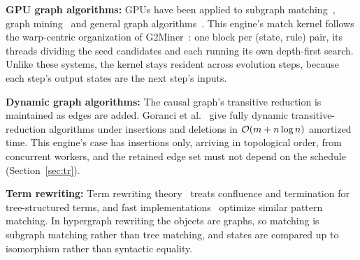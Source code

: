 \textbf{GPU graph algorithms:} GPUs have been applied to subgraph matching~\cite{tran2015fast}, graph mining~\cite{chen2021pangolin} and general graph algorithms~\cite{wang2016gunrock}. This engine's match kernel follows the warp-centric organization of G2Miner~\cite{chen2022g2miner}: one block per (state, rule) pair, its threads dividing the seed candidates and each running its own depth-first search. Unlike these systems, the kernel stays resident across evolution steps, because each step's output states are the next step's inputs.

\textbf{Dynamic graph algorithms:} The causal graph's transitive reduction is maintained as edges are added. Goranci et al.~\cite{goranci2025dynamic} give fully dynamic transitive-reduction algorithms under insertions and deletions in $\mathcal{O}(m + n\log n)$ amortized time. This engine's case has insertions only, arriving in topological order, from concurrent workers, and the retained edge set must not depend on the schedule (Section~\ref{sec:tr}).

\textbf{Term rewriting:} Term rewriting theory~\cite{baader1998term} treats confluence and termination for tree-structured terms, and fast implementations~\cite{van2019fastest} optimize similar pattern matching. In hypergraph rewriting the objects are graphs, so matching is subgraph matching rather than tree matching, and states are compared up to isomorphism rather than syntactic equality.

